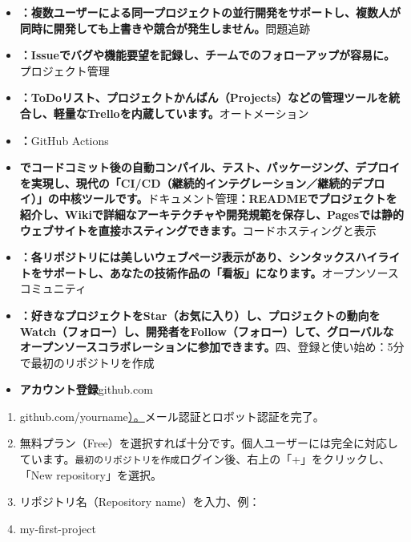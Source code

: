 \begin{itemize}
  \item \textbf{：複数ユーザーによる同一プロジェクトの並行開発をサポートし、複数人が同時に開発しても上書きや競合が発生しません。}問題追跡
  \item \textbf{：Issueでバグや機能要望を記録し、チームでのフォローアップが容易に。}プロジェクト管理
  \item \textbf{：ToDoリスト、プロジェクトかんばん（Projects）などの管理ツールを統合し、軽量なTrelloを内蔵しています。}オートメーション
  \item \textbf{：}GitHub Actions
  \item \textbf{でコードコミット後の自動コンパイル、テスト、パッケージング、デプロイを実現し、現代の「CI/CD（継続的インテグレーション／継続的デプロイ）」の中核ツールです。}ドキュメント管理\textbf{：READMEでプロジェクトを紹介し、Wikiで詳細なアーキテクチャや開発規範を保存し、Pagesでは静的ウェブサイトを直接ホスティングできます。}コードホスティングと表示
  \item \textbf{：各リポジトリには美しいウェブページ表示があり、シンタックスハイライトをサポートし、あなたの技術作品の「看板」になります。}オープンソースコミュニティ
  \item \textbf{：好きなプロジェクトをStar（お気に入り）し、プロジェクトの動向をWatch（フォロー）し、開発者をFollow（フォロー）して、グローバルなオープンソースコラボレーションに参加できます。}四、登録と使い始め：5分で最初のリポジトリを作成
  \item \textbf{アカウント登録}github.com
\end{itemize}



\begin{enumerate}
  \item github.com/yourname\href{https://github.com}{）。}メール認証とロボット認証を完了。
  \item 無料プラン（Free）を選択すれば十分です。個人ユーザーには完全に対応しています。\texttt{最初のリポジトリを作成}ログイン後、右上の「+」をクリックし、「New repository」を選択。
  \item リポジトリ名（Repository name）を入力、例：
  \item my-first-project
\end{enumerate}


